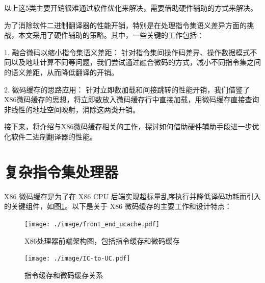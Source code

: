   
  

以上这5类主要开销很难通过软件优化来解决，需要借助硬件辅助的方式来解决。

为了消除软件二进制翻译器的性能开销，特别是在处理指令集语义差异方面的挑战，本文采用了硬件辅助的策略。其中，一些关键的工作包括：

1. 融合微码以缩小指令集语义差距： 针对指令集间操作码差异、操作数据模式不同以及地址计算不同等问题，我们尝试通过融合微码的方式，减小不同指令集之间的语义差距，从而降低翻译的开销。

2. 微码缓存的思路应用： 针对立即数加载和间接跳转的性能开销，我们借鉴了X86微码缓存的思想，将立即数放入微码缓存行中直接加载，用微码缓存直接查询非线性的地址空间映射，消除这两类开销。

接下来，将介绍与X86微码缓存相关的工作，探讨如何借助硬件辅助手段进一步优化软件二进制翻译器的性能。


\section{复杂指令集处理器}

X86 微码缓存是为了在 X86 CPU 后端实现超标量乱序执行并降低译码功耗而引入的关键组件\cite{solomonMicrooperationCachePower2001}，如图\ref{img:front_end_ucache}。以下是关于 X86 微码缓存的主要工作和设计特点：

\begin{figure}[h]
  \centering
  \texttt{[image: ./image/front\_end\_ucache.pdf]}
  \caption{X86处理器前端架构图，包括指令缓存和微码缓存}
  \label{img:front_end_ucache}
\end{figure}

\begin{figure}[h]
  \centering
  \texttt{[image: ./image/IC-to-UC.pdf]}
  \caption{指令缓存和微码缓存关系}
  \label{img:IC_to_UC}
\end{figure}

